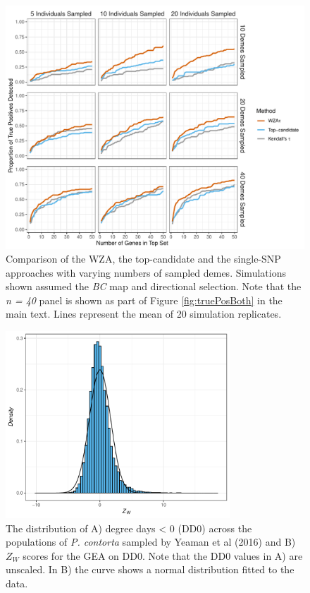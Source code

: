 \documentclass[10pt,twoside,lineno]{GSA_format}
\begin{document}
\begin{figure}[H]
  \includegraphics[width = \textwidth,keepaspectratio]{Plots/SampleSizeComparison_individuals.pdf}
  \caption{Comparison of the WZA, the top-candidate and the single-SNP approaches with varying numbers of sampled demes. Simulations shown assumed the \textit{BC} map and directional selection. Note that the \textit{n = 40} panel is shown as part of Figure \ref{fig:truePosBoth} in the main text. Lines represent the mean of 20 simulation replicates.}

  \label{fig:sampleSize_individuals}
\end{figure}

\pagebreak
\begin{figure}[H]
  \includegraphics[width=0.75\textwidth,height=0.75\textheight,keepaspectratio]{../dataAnalsis/pineAnalysis_SuppFig.pdf}
  \caption{The distribution of A) degree days < 0 (DD0) across the populations of \textit{P. contorta} sampled by Yeaman et al (2016) and B) $Z_W$ scores for the GEA on DD0. Note that the DD0 values in A) are unscaled. In B) the curve shows a normal distribution fitted to the data.}

  \label{fig:lodgepoleDescriptives}
\end{figure}
\end{document}
